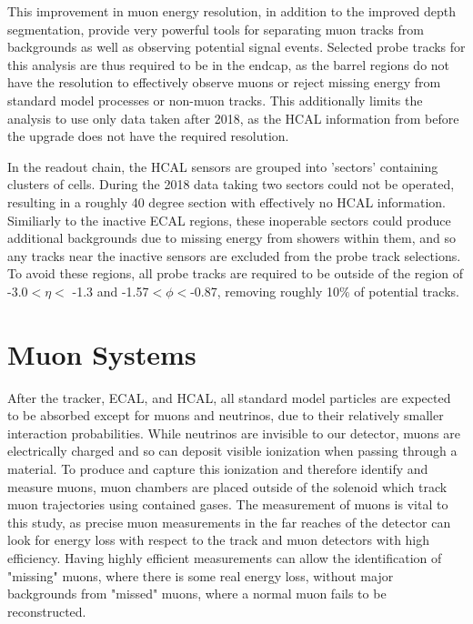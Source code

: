 This improvement in muon energy resolution, in addition to the improved depth segmentation, provide very powerful tools for separating muon tracks from backgrounds as well as observing potential signal events.
Selected probe tracks for this analysis are thus required to be in the endcap, as the barrel regions do not have the resolution to effectively observe muons or reject missing energy from standard model processes or non-muon tracks.
This additionally limits the analysis to use only data taken after 2018, as the HCAL information from before the upgrade does not have the required resolution.

In the readout chain, the HCAL sensors are grouped into 'sectors' containing clusters of cells. During the 2018 data taking two sectors could not be operated, resulting in a roughly 40 degree section with effectively no HCAL information. Similiarly to the inactive ECAL regions, these inoperable sectors could produce additional backgrounds due to missing energy from showers within them, and so any tracks near the inactive sensors are excluded from the probe track selections. 
To avoid these regions, all probe tracks are required to be outside of the region of -3.0$<\eta<$ -1.3 and -1.57$<\phi<$-0.87, removing roughly 10$\%$ of potential tracks.

\section{Muon Systems}
After the tracker, ECAL, and HCAL, all standard model particles are expected to be absorbed except for muons and neutrinos, due to their relatively smaller interaction probabilities.
While neutrinos are invisible to our detector, muons are electrically charged and so can deposit visible ionization when passing through a material.
To produce and capture this ionization and therefore identify and measure muons, muon chambers are placed outside of the solenoid which track muon trajectories using contained gases.
The measurement of muons is vital to this study, as precise muon measurements in the far reaches of the detector can look for energy loss with respect to the track and muon detectors with high efficiency. 
Having highly efficient measurements can allow the identification of "missing" muons, where there is some real energy loss, without major backgrounds from "missed" muons, where a normal muon fails to be reconstructed.

